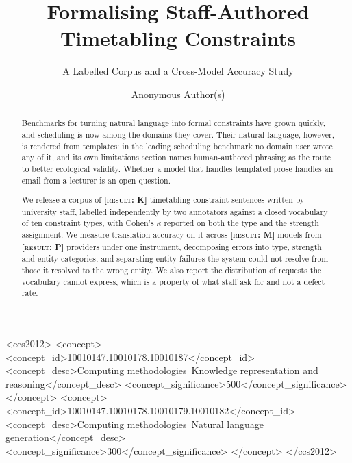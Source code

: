 \documentclass[sigconf,screen,review,anonymous]{acmart}
\newcommand{\result}[1]{\textbf{[\textsc{result}: #1]}}
\begin{document}
\title{Formalising Staff-Authored Timetabling Constraints}
\subtitle{A Labelled Corpus and a Cross-Model Accuracy Study}

\author{Anonymous Author(s)}

\begin{abstract}
Benchmarks for turning natural language into formal constraints have grown
quickly, and scheduling is now among the domains they cover. Their natural
language, however, is rendered from templates: in the leading scheduling
benchmark no domain user wrote any of it, and its own limitations section
names human-authored phrasing as the route to better ecological validity.
Whether a model that handles templated prose handles an email from a lecturer
is an open question.

We release a corpus of \result{K} timetabling constraint sentences written by
university staff, labelled independently by two annotators against a closed
vocabulary of ten constraint types, with Cohen's $\kappa$ reported on both the
type and the strength assignment. We measure translation accuracy on it across
\result{M} models from \result{P} providers under one instrument, decomposing
errors into type, strength and entity categories, and separating entity
failures the system could not resolve from those it resolved to the wrong
entity. We also report the distribution of requests the vocabulary cannot
express, which is a property of what staff ask for and not a defect rate.
\end{abstract}

\begin{CCSXML}
<ccs2012>
<concept>
<concept_id>10010147.10010178.10010187</concept_id>
<concept_desc>Computing methodologies~Knowledge representation and reasoning</concept_desc>
<concept_significance>500</concept_significance>
</concept>
<concept>
<concept_id>10010147.10010178.10010179.10010182</concept_id>
<concept_desc>Computing methodologies~Natural language generation</concept_desc>
<concept_significance>300</concept_significance>
</concept>
</ccs2012>
\end{CCSXML}



\maketitle
\end{document}
